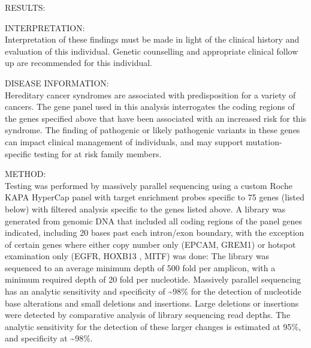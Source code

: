 \documentclass[10pt]{article}
\newcommand{\data}[1]{}
\newenvironment{dataiter}[1]{}{}
\begin{document}
RESULTS: \data{plugin:summary_blurb}

\begin{dataiter}{variants}
  \data{mega_hgvs}\newline
\end{dataiter}

INTERPRETATION: \\
\data{plugin:long_blurb}

Interpretation of these findings must be made in light of the clinical history and evaluation of this individual. Genetic counselling and appropriate clinical follow up are recommended for this individual.

DISEASE INFORMATION: \\
Hereditary cancer syndromes are associated with predisposition for a variety of cancers. The gene panel used in this analysis interrogates the coding regions of the genes specified above that have been associated with an increased risk for this syndrome. The finding of pathogenic or likely pathogenic variants in these genes can impact clinical management of individuals, and may support mutation-specific testing for at risk family members.

METHOD: \\
Testing was performed by massively parallel sequencing using a custom Roche KAPA HyperCap panel with target enrichment probes specific to 75 genes (listed below) with filtered analysis specific to the genes listed above. A library was generated from genomic DNA that included all coding regions of the panel genes indicated, including 20 bases past each intron/exon boundary, with the exception of certain genes where either copy number only (EPCAM, GREM1) or hotspot examination only (EGFR, HOXB13 , MITF) was done: The library was sequenced to an average minimum depth of 500 fold per amplicon, with a minimum required depth of 20 fold per nucleotide. Massively parallel sequencing has an analytic sensitivity and specificity of \textasciitilde 98\% for the detection of nucleotide base alterations and small deletions and insertions. Large deletions or insertions were detected by comparative analysis of library sequencing read depths. The analytic sensitivity for the detection of these larger changes is estimated at 95\%, and specificity at \textasciitilde 98\%.
\end{document}
